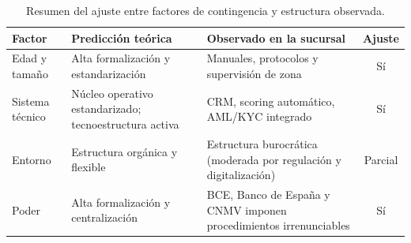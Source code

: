 \begin{table}[htbp]
  \centering
  \caption{Resumen del ajuste entre factores de contingencia y estructura observada.}
  \label{tab:ajuste_factores}
  \small
  \begin{tabular}{p{2.8cm} p{3.8cm} p{4.5cm} c}
    \toprule
    \textbf{Factor} & \textbf{Predicción teórica} & \textbf{Observado en la sucursal} & \textbf{Ajuste} \\
    \midrule
    Edad y tamaño & Alta formalización y estandarización & Manuales, protocolos y supervisión de zona & Sí \\
    \addlinespace
    Sistema técnico & Núcleo operativo estandarizado; tecnoestructura activa & CRM, scoring automático, AML/KYC integrado & Sí \\
    \addlinespace
    Entorno & Estructura orgánica y flexible & Estructura burocrática (moderada por regulación y digitalización) & Parcial \\
    \addlinespace
    Poder & Alta formalización y centralización & BCE, Banco de España y CNMV imponen procedimientos irrenunciables & Sí \\
    \bottomrule
  \end{tabular}
\end{table}

